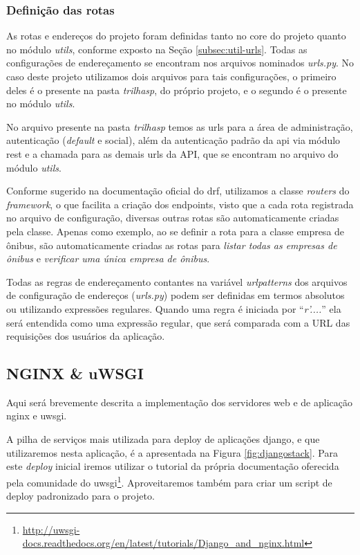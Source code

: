 \subsubsection{Definição das rotas}
As rotas e endereços do projeto foram definidas tanto no core do projeto quanto no módulo \textit{utils}, conforme exposto na Seção \ref{subsec:util-urls}. Todas as configurações de endereçamento se encontram nos arquivos nominados \textit{urls.py}. No caso deste projeto utilizamos dois arquivos para tais configurações, o primeiro deles é o presente na pasta \textit{trilhasp}, do próprio projeto, e o segundo é o presente no módulo \textit{utils}.

No arquivo presente na pasta \textit{trilhasp} temos as urls para a área de administração, autenticação (\textit{default} e social), além da autenticação padrão da \gls{api} via módulo \gls{rest} e a chamada para as demais urls da API, que se encontram no arquivo do módulo \textit{utils}.

Conforme sugerido na documentação oficial do \gls{drf}, utilizamos a classe \textit{routers} do \textit{framework}, o que facilita a criação dos endpoints, visto que a cada rota registrada no arquivo de configuração, diversas outras rotas são automaticamente criadas pela classe. Apenas como exemplo, ao se definir a rota para a classe empresa de ônibus, são automaticamente criadas as rotas para \textit{listar todas as empresas de ônibus} e \textit{verificar uma única empresa de ônibus}.

Todas as regras de endereçamento contantes na variável \textit{urlpatterns} dos arquivos de configuração de endereços (\textit{urls.py}) podem ser definidas em termos absolutos ou utilizando expressões regulares. Quando uma regra é iniciada por ``\textit{r'....}'' ela será entendida como uma expressão regular, que será comparada com a URL das requisições dos usuários da aplicação.

\subsection{NGINX \& uWSGI}
Aqui será brevemente descrita a implementação dos servidores web e de aplicação \gls{nginx} e \gls{uwsgi}.

A pilha de serviços mais utilizada para deploy de aplicações \gls{django}, e que utilizaremos nesta aplicação, é a apresentada na Figura \ref{fig:djangostack}.
Para este \textit{deploy} inicial iremos utilizar o tutorial da própria documentação oferecida pela comunidade do \gls{uwsgi}\footnote{\url{http://uwsgi-docs.readthedocs.org/en/latest/tutorials/Django_and_nginx.html}}. Aproveitaremos também para criar um script de deploy padronizado para o projeto.

